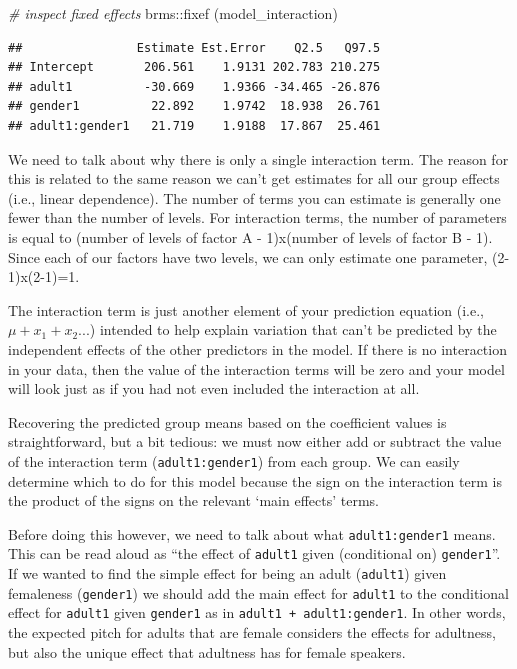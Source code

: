 \documentclass[
]{book}
\newenvironment{Shaded}{\begin{snugshade}}{\end{snugshade}}
\newcommand{\CommentTok}[1]{\textcolor[rgb]{0.56,0.35,0.01}{\textit{#1}}}
\newcommand{\FunctionTok}[1]{\textcolor[rgb]{0.00,0.00,0.00}{#1}}
\newcommand{\NormalTok}[1]{#1}
\newcommand{\SpecialCharTok}[1]{\textcolor[rgb]{0.00,0.00,0.00}{#1}}
\begin{document}
\begin{Shaded}
\begin{Highlighting}[]
\CommentTok{\# inspect fixed effects}
\NormalTok{brms}\SpecialCharTok{::}\FunctionTok{fixef}\NormalTok{ (model\_interaction)}
\end{Highlighting}
\end{Shaded}

\begin{verbatim}
##                Estimate Est.Error    Q2.5   Q97.5
## Intercept       206.561    1.9131 202.783 210.275
## adult1          -30.669    1.9366 -34.465 -26.876
## gender1          22.892    1.9742  18.938  26.761
## adult1:gender1   21.719    1.9188  17.867  25.461
\end{verbatim}

We need to talk about why there is only a single interaction term. The reason for this is related to the same reason we can't get estimates for all our group effects (i.e., linear dependence). The number of terms you can estimate is generally one fewer than the number of levels. For interaction terms, the number of parameters is equal to (number of levels of factor A - 1)x(number of levels of factor B - 1). Since each of our factors have two levels, we can only estimate one parameter, (2-1)x(2-1)=1.

The interaction term is just another element of your prediction equation (i.e., \(\mu + x_1+x_2...\)) intended to help explain variation that can't be predicted by the independent effects of the other predictors in the model. If there is no interaction in your data, then the value of the interaction terms will be zero and your model will look just as if you had not even included the interaction at all.

Recovering the predicted group means based on the coefficient values is straightforward, but a bit tedious: we must now either add or subtract the value of the interaction term (\texttt{adult1:gender1}) from each group. We can easily determine which to do for this model because the sign on the interaction term is the product of the signs on the relevant `main effects' terms.

Before doing this however, we need to talk about what \texttt{adult1:gender1} means. This can be read aloud as ``the effect of \texttt{adult1} given (conditional on) \texttt{gender1}''. If we wanted to find the simple effect for being an adult (\texttt{adult1}) given femaleness (\texttt{gender1}) we should add the main effect for \texttt{adult1} to the conditional effect for \texttt{adult1} given \texttt{gender1} as in \texttt{adult1\ +\ adult1:gender1}. In other words, the expected pitch for adults that are female considers the effects for adultness, but also the unique effect that adultness has for female speakers.
\end{document}
